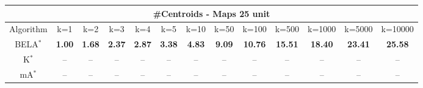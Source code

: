 \begin{tabular}{c|cccccccccccc}\toprule
\multicolumn{13}{c}{#Centroids - Maps 25 unit}\\ \midrule
Algorithm & k=1 & k=2 & k=3 & k=4 & k=5 & k=10 & k=50 & k=100 & k=500 & k=1000 & k=5000 & k=10000 \\ \midrule
BELA$^*$ & \textbf{1.00} & \textbf{1.68} & \textbf{2.37} & \textbf{2.87} & \textbf{3.38} & \textbf{4.83} & \textbf{9.09} & \textbf{10.76} & \textbf{15.51} & \textbf{18.40} & \textbf{23.41} & \textbf{25.58} \\
K$^*$ & -- & -- & -- & -- & -- & -- & -- & -- & -- & -- & -- & -- \\
mA$^*$ & -- & -- & -- & -- & -- & -- & -- & -- & -- & -- & -- & -- \\ \bottomrule 
\end{tabular}
